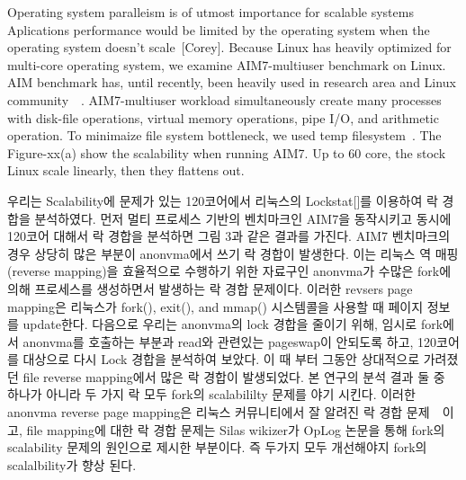 Operating system paralleism is of utmost importance for scalable systems
Aplications performance would be limited by the operating system when the
operating system doesn't scale~\cite{Clements15SCR}[Corey].
Because Linux has heavily optimized for multi-core operating system, we examine
AIM7-multiuser benchmark on Linux.
AIM benchmark has, until recently, been heavily used in research area and Linux
community~\cite{Bueso2015STP}~\cite{Bueso2014MCS}.
AIM7-multiuser workload simultaneously create many processes with disk-file
operations, virtual memory operations, pipe I/O, and arithmetic operation. 
To minimaize file system bottleneck, we used temp
filesystem~\cite{Rohland2001Tempfs}.
The Figure-xx(a) show the scalability when running AIM7.
Up to 60 core, the stock Linux scale linearly, then they flattens out.
\fi


\ifkor
우리는 Scalability에 문제가 있는 120코어에서 리눅스의 Lockstat[]를 이용하여 락 경합을 분석하였다. 
먼저 멀티 프로세스 기반의 벤치마크인 AIM7을 동작시키고 동시에 120코어 대해서 락 경합을 분석하면 
그림 3과 같은 결과를 가진다. 
AIM7 벤치마크의 경우 상당히 많은 부분이 anonvma에서 쓰기 락 경합이 발생한다. 
이는 리눅스 역 매핑(reverse mapping)을 효율적으로 수행하기 위한 자료구인 anonvma가
수많은 fork에 의해 프로세스를 생성하면서 발생하는 락 경합 문제이다. 
이러한 revsers page mapping은 리눅스가 fork(), exit(), and mmap() 시스템콜을 사용할 때 페이지 정보를
update한다.
다음으로 우리는 anonvma의 lock 경합을 줄이기 위해, 임시로 fork에서 anonvma를 호출하는 부분과 read와
관련있는 pageswap이 안되도록 하고, 120코어를 대상으로 다시 Lock 경합을 분석하여 보았다.
이 때 부터 그동안 상대적으로 가려졌던 file reverse mapping에서 많은 락 경합이 발생되었다.
본 연구의 분석 결과 둘 중 하나가 아니라 두 가지 락 모두 fork의 scalabililty 문제를 야기 시킨다.
이러한 anonvma reverse page mapping은 리눅스 커뮤니티에서 잘 알려진 락 경합
문제~\cite{Andi2011adding}~\cite{Tim2013adding}이고, file mapping에 대한 락 경합 문제는
Silas wikizer가 OpLog 논문을 통해 fork의 scalability 문제의 원인으로 제시한 부분이다.
즉 두가지 모두 개선해야지 fork의 scalalbility가 향상 된다. 
\else

